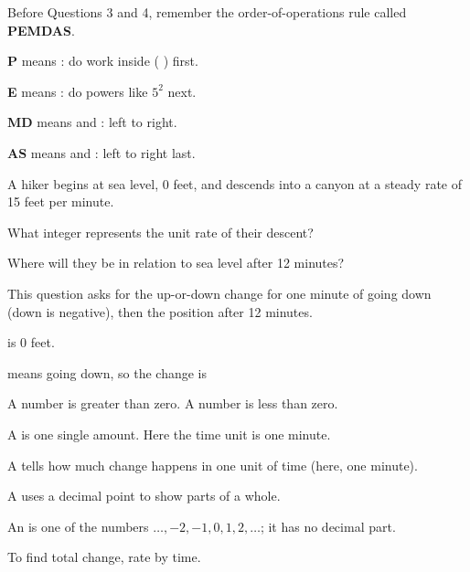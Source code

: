 

\noindent Before Questions 3 and 4, remember the order-of-operations rule called \textbf{PEMDAS}.

\begin{words}
  \item \textbf{P} means : do work inside ( ) first.
  \item \textbf{E} means : do powers like $5^{2}$ next.
  \item \textbf{MD} means and : left to right.
  \item \textbf{AS} means and : left to right last.
\end{words}


\noindent A hiker begins at sea level, 0 feet, and descends into a canyon at a steady rate of 15 feet per minute.

\par\noindent{}What integer represents the unit rate of their descent?

\par\noindent{}Where will they be in relation to sea level after 12 minutes?


\noindent This question asks for the up-or-down change for one minute of going down (down is negative), then the position after 12 minutes.

\begin{words}
  \item {}is 0 feet.
  \item {}means going down, so the change is 
  \item A number is greater than zero. A number is less than zero.
  \item A is one single amount. Here the time unit is one minute.
  \item A tells how much change happens in one unit of time (here, one minute).
  \item A uses a decimal point to show parts of a whole.
  \item An is one of the numbers $\ldots, -2, -1, 0, 1, 2, \ldots$; it has no decimal part.
  \item To find total change, rate by time.
\end{words}


